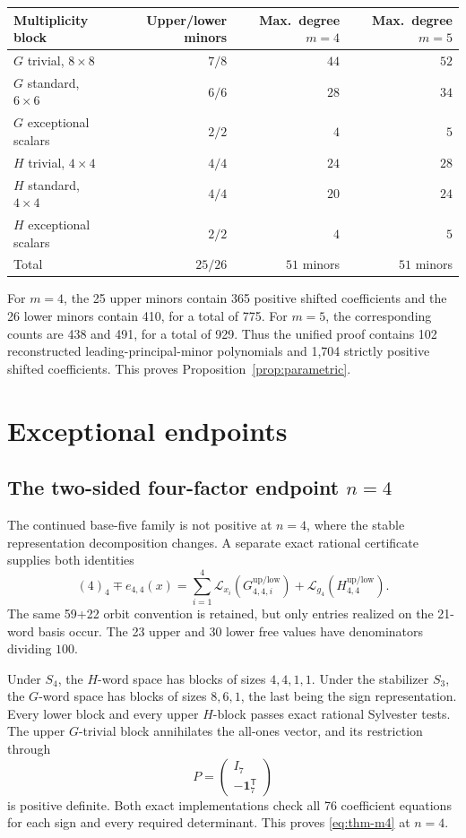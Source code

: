 \documentclass[11pt]{article}
\newcommand{\Lcal}{\mathcal L}
\newcommand{\fall}[2]{(#1)_{#2}}
\newcommand{\up}{\mathrm{up}}
\newcommand{\low}{\mathrm{low}}
\newcommand{\one}{\mathbf 1}
\begin{document}
\begin{center}
\small
\begin{tabular}{lrrr}
\toprule
Multiplicity block & Upper/lower minors & Max.\ degree \(m=4\) & Max.\ degree \(m=5\)\\
\midrule
\(G\) trivial, \(8\times8\) & \(7/8\) & \(44\) & \(52\)\\
\(G\) standard, \(6\times6\) & \(6/6\) & \(28\) & \(34\)\\
\(G\) exceptional scalars & \(2/2\) & \(4\) & \(5\)\\
\(H\) trivial, \(4\times4\) & \(4/4\) & \(24\) & \(28\)\\
\(H\) standard, \(4\times4\) & \(4/4\) & \(20\) & \(24\)\\
\(H\) exceptional scalars & \(2/2\) & \(4\) & \(5\)\\
\midrule
Total & \(25/26\) & \(51\) minors & \(51\) minors\\
\bottomrule
\end{tabular}
\end{center}

For \(m=4\), the 25 upper minors contain 365 positive shifted coefficients and the 26 lower minors contain 410, for a total of 775.  For \(m=5\), the corresponding counts are 438 and 491, for a total of 929.  Thus the unified proof contains 102 reconstructed leading-principal-minor polynomials and 1,704 strictly positive shifted coefficients.  This proves Proposition~\ref{prop:parametric}.

\section{Exceptional endpoints}\label{sec:endpoints}

\subsection{The two-sided four-factor endpoint \texorpdfstring{\(n=4\)}{n=4}}

The continued base-five family is not positive at \(n=4\), where the stable representation decomposition changes.  A separate exact rational certificate supplies both identities
\[
 \fall44\mp e_{4,4}(x)
 =
 \sum_{i=1}^4\Lcal_{x_i}(G_{4,4,i}^{\up/\low})
 +\Lcal_{g_4}(H_{4,4}^{\up/\low}).
\]
The same 59+22 orbit convention is retained, but only entries realized on the 21-word basis occur.  The 23 upper and 30 lower free values have denominators dividing \(100\).

Under \(S_4\), the \(H\)-word space has blocks of sizes \(4,4,1,1\).  Under the stabilizer \(S_3\), the \(G\)-word space has blocks of sizes \(8,6,1\), the last being the sign representation.  Every lower block and every upper \(H\)-block passes exact rational Sylvester tests.  The upper \(G\)-trivial block annihilates the all-ones vector, and its restriction through
\[
 P=\begin{pmatrix}I_7\\-\one_7^{\mathsf T}\end{pmatrix}
\]
is positive definite.  Both exact implementations check all 76 coefficient equations for each sign and every required determinant.  This proves \eqref{eq:thm-m4} at \(n=4\).
\end{document}
